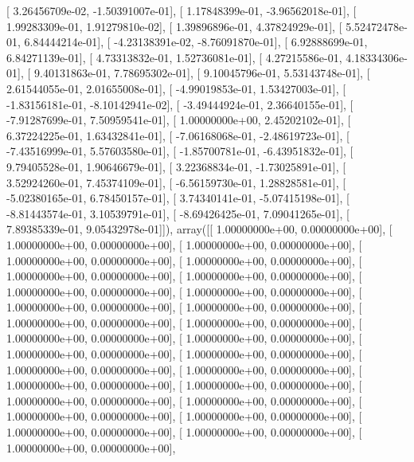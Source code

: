 \documentclass{article}
\begin{document}
       [  3.26456709e-02,  -1.50391007e-01],
       [  1.17848399e-01,  -3.96562018e-01],
       [  1.99283309e-01,   1.91279810e-02],
       [  1.39896896e-01,   4.37824929e-01],
       [  5.52472478e-01,   6.84444214e-01],
       [ -4.23138391e-02,  -8.76091870e-01],
       [  6.92888699e-01,   6.84271139e-01],
       [  4.73313832e-01,   1.52736081e-01],
       [  4.27215586e-01,   4.18334306e-01],
       [  9.40131863e-01,   7.78695302e-01],
       [  9.10045796e-01,   5.53143748e-01],
       [  2.61544055e-01,   2.01655008e-01],
       [ -4.99019853e-01,   1.53427003e-01],
       [ -1.83156181e-01,  -8.10142941e-02],
       [ -3.49444924e-01,   2.36640155e-01],
       [ -7.91287699e-01,   7.50959541e-01],
       [  1.00000000e+00,   2.45202102e-01],
       [  6.37224225e-01,   1.63432841e-01],
       [ -7.06168068e-01,  -2.48619723e-01],
       [ -7.43516999e-01,   5.57603580e-01],
       [ -1.85700781e-01,  -6.43951832e-01],
       [  9.79405528e-01,   1.90646679e-01],
       [  3.22368834e-01,  -1.73025891e-01],
       [  3.52924260e-01,   7.45374109e-01],
       [ -6.56159730e-01,   1.28828581e-01],
       [ -5.02380165e-01,   6.78450157e-01],
       [  3.74340141e-01,  -5.07415198e-01],
       [ -8.81443574e-01,   3.10539791e-01],
       [ -8.69426425e-01,   7.09041265e-01],
       [  7.89385339e-01,   9.05432978e-01]]), array([[  1.00000000e+00,   0.00000000e+00],
       [  1.00000000e+00,   0.00000000e+00],
       [  1.00000000e+00,   0.00000000e+00],
       [  1.00000000e+00,   0.00000000e+00],
       [  1.00000000e+00,   0.00000000e+00],
       [  1.00000000e+00,   0.00000000e+00],
       [  1.00000000e+00,   0.00000000e+00],
       [  1.00000000e+00,   0.00000000e+00],
       [  1.00000000e+00,   0.00000000e+00],
       [  1.00000000e+00,   0.00000000e+00],
       [  1.00000000e+00,   0.00000000e+00],
       [  1.00000000e+00,   0.00000000e+00],
       [  1.00000000e+00,   0.00000000e+00],
       [  1.00000000e+00,   0.00000000e+00],
       [  1.00000000e+00,   0.00000000e+00],
       [  1.00000000e+00,   0.00000000e+00],
       [  1.00000000e+00,   0.00000000e+00],
       [  1.00000000e+00,   0.00000000e+00],
       [  1.00000000e+00,   0.00000000e+00],
       [  1.00000000e+00,   0.00000000e+00],
       [  1.00000000e+00,   0.00000000e+00],
       [  1.00000000e+00,   0.00000000e+00],
       [  1.00000000e+00,   0.00000000e+00],
       [  1.00000000e+00,   0.00000000e+00],
       [  1.00000000e+00,   0.00000000e+00],
       [  1.00000000e+00,   0.00000000e+00],
       [  1.00000000e+00,   0.00000000e+00],
       [  1.00000000e+00,   0.00000000e+00],
\end{document}
